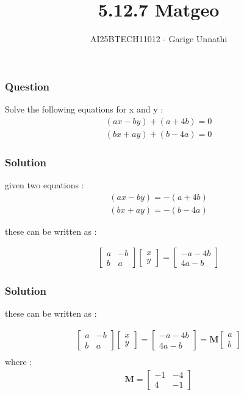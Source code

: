 \documentclass{beamer}
\title{5.12.7 Matgeo}
\author{AI25BTECH11012 - Garige Unnathi}
\date{}
\begin{document}
\frame{\titlepage}

\begin{frame}
\frametitle{Question}
 Solve the following equations for x and y :
 \begin{align*}
     (ax - by) + (a + 4b)= 0 \\
     (bx + ay) + (b - 4a)= 0
 \end{align*}
\end{frame}


\begin{frame}
\frametitle{Solution}
given two equations :
 \begin{align}
     (ax - by) =  -(a + 4b) \\
     (bx + ay) = -(b - 4a)
 \end{align}

 these can be written as :

 \begin{align}
     \begin{bmatrix}a & -b \\ b & a\end{bmatrix}\begin{bmatrix}x \\ y\end{bmatrix} = \begin{bmatrix}-a-4b \\ 4a -b\end{bmatrix}
 \end{align}
\end{frame}

\begin{frame}
\frametitle{Solution}
 these can be written as :

 \begin{align}
    \begin{bmatrix}a & -b \\ b & a\end{bmatrix}\begin{bmatrix}x \\ y\end{bmatrix} = \begin{bmatrix}-a-4b \\ 4a -b\end{bmatrix} = \textbf{M}\begin{bmatrix}a \\ b\end{bmatrix} \\
\end{align}
where :
\begin{align}
     \textbf{M} = \begin{bmatrix}-1 & -4 \\ 4 & -1\end{bmatrix}
 \end{align}

\end{frame}
\end{document}
